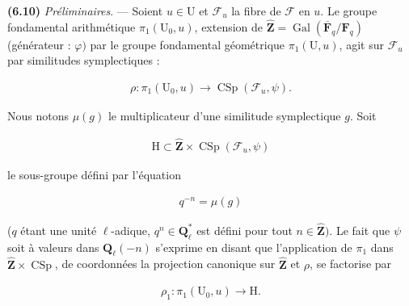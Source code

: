 \documentclass[10pt,leqno]{article}
\begin{document}
\noindent \textbf{(6.10)} \emph{Préliminaires}. — Soient \(u\in \mathrm{U}\) et \(\mathcal{F} _{u}\) la fibre de \(\mathcal{F} \) en \(u\). Le groupe fondamental arithmétique \(\pi _{1}(\mathrm{U}_{0},u)\), extension de \(\widehat{\mathbf{Z}}=\operatorname{Gal}(\overline{\mathbf{F}}_{q}/\mathbf{F}_{q})\) (générateur : \(\varphi )\) par le groupe fondamental géométrique \(\pi _{1}(\mathrm{U},u)\), agit sur \(\mathcal{F} _{u}\) par similitudes symplectiques :\par

\begin{equation*}\begin{gathered}\rho  : \pi _{1}(\mathrm{U}_{0},u) \longrightarrow  \operatorname{CSp}(\mathcal{F} _{u},\psi ).\end{gathered}\end{equation*}

\clearpage

\label{physical-27}\par\smallskip

\noindent Nous notons \(\mu (g)\) le multiplicateur d’une similitude symplectique \(g\). Soit\par

\begin{equation*}\begin{gathered}\mathrm{H}\subset \widehat{\mathbf{Z}}\times \operatorname{CSp}(\mathcal{F} _{u},\psi )\end{gathered}\end{equation*}

\noindent le sous-groupe défini par l’équation\par

\begin{equation*}\begin{gathered}q^{- n}=\mu (g)\end{gathered}\end{equation*}

\noindent (\(q\) étant une unité \(\ell \)-adique, \(q^{n}\in \mathbf{Q}_{\ell }^{*}\) est défini pour tout \(n\in \widehat{\mathbf{Z}})\). Le fait que \(\psi \) soit à valeurs dans \(\mathbf{Q}_{\ell }(- n)\) s’exprime en disant que l’application de \(\pi _{1}\) dans \(\widehat{\mathbf{Z}}\times \operatorname{CSp}\), de coordonnées la projection canonique sur \(\widehat{\mathbf{Z}}\) et \(\rho \), se factorise par\par

\begin{equation*}\begin{gathered}\rho _{1} : \pi _{1}(\mathrm{U}_{0},u) \longrightarrow  \mathrm{H}.\end{gathered}\end{equation*}
\end{document}
